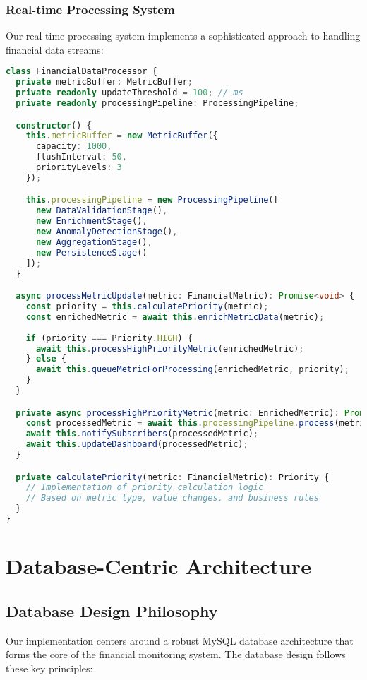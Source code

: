 \documentclass[conference]{IEEEtran}
\begin{document}
\subsubsection{Real-time Processing System}
Our real-time processing system implements a sophisticated approach to handling financial data streams:

\begin{lstlisting}[language=TypeScript, caption=Advanced Real-time Processing Implementation]
class FinancialDataProcessor {
  private metricBuffer: MetricBuffer;
  private readonly updateThreshold = 100; // ms
  private readonly processingPipeline: ProcessingPipeline;

  constructor() {
    this.metricBuffer = new MetricBuffer({
      capacity: 1000,
      flushInterval: 50,
      priorityLevels: 3
    });

    this.processingPipeline = new ProcessingPipeline([
      new DataValidationStage(),
      new EnrichmentStage(),
      new AnomalyDetectionStage(),
      new AggregationStage(),
      new PersistenceStage()
    ]);
  }

  async processMetricUpdate(metric: FinancialMetric): Promise<void> {
    const priority = this.calculatePriority(metric);
    const enrichedMetric = await this.enrichMetricData(metric);
    
    if (priority === Priority.HIGH) {
      await this.processHighPriorityMetric(enrichedMetric);
    } else {
      await this.queueMetricForProcessing(enrichedMetric, priority);
    }
  }

  private async processHighPriorityMetric(metric: EnrichedMetric): Promise<void> {
    const processedMetric = await this.processingPipeline.process(metric);
    await this.notifySubscribers(processedMetric);
    await this.updateDashboard(processedMetric);
  }

  private calculatePriority(metric: FinancialMetric): Priority {
    // Implementation of priority calculation logic
    // Based on metric type, value changes, and business rules
  }
}
\end{lstlisting}

\section{Database-Centric Architecture}
\subsection{Database Design Philosophy}
Our implementation centers around a robust MySQL database architecture that forms the core of the financial monitoring system. The database design follows these key principles:
\end{document}
